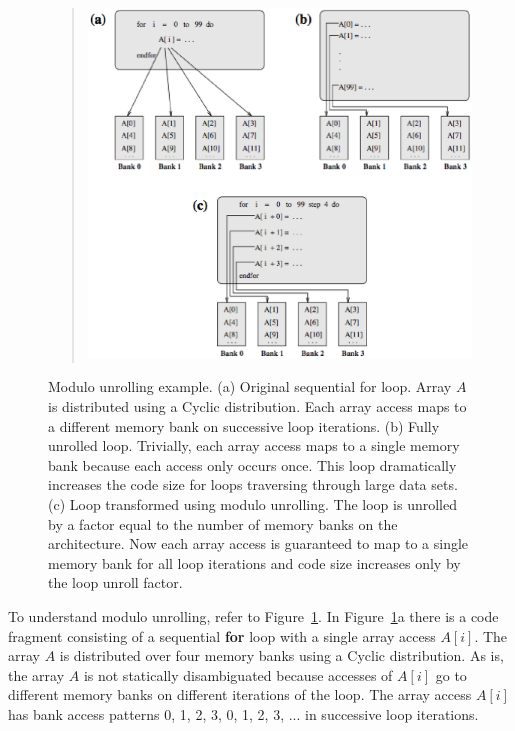 \begin{figure}
\begin{center}
\renewcommand{\baselinestretch}{1}
\small\normalsize
\begin{quote}
\includegraphics[width=\linewidth]{./Figures/modulo_unrolling.eps}
\caption[Modulo unrolling example]{Modulo unrolling example. (a) Original sequential for loop. Array $A$ is distributed using a Cyclic distribution. Each array access maps to a different memory bank on successive loop iterations. (b) Fully unrolled loop. Trivially, each array access maps to a single memory bank because each access only occurs once. This loop dramatically increases the code size for loops traversing through large data sets. (c) Loop transformed using modulo unrolling. The loop is unrolled by a factor equal to the number of memory banks on the architecture. Now each array access is guaranteed to map to a single memory bank for all loop iterations and code size increases only by the loop unroll factor.\label{modulo_unrolling}}
\end{quote}
\end{center}
\end{figure}

To understand modulo unrolling, refer to Figure~\ref{modulo_unrolling}. In Figure~\ref{modulo_unrolling}a there is a code fragment consisting of a sequential \textbf{for} loop with a single array access $A[i]$. The array $A$ is distributed over four memory banks using a Cyclic distribution. As is, the array $A$ is not statically disambiguated because accesses of $A[i]$ go to different memory banks on different iterations of the loop. The array access $A[i]$ has bank access patterns 0, 1, 2, 3, 0, 1, 2, 3, ... in successive loop iterations. 

